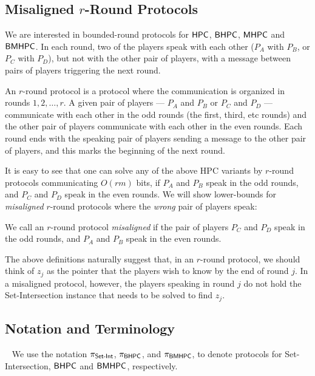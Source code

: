 \documentclass[11pt,letterpaper]{article}
\theoremstyle{definition}
\newcommand{\bhpc}{\ensuremath{\textnormal{\textsf{BHPC}}}\xspace}
\newcommand{\bmhpc}{\ensuremath{\textnormal{\textsf{BMHPC}}}\xspace}
\newcommand{\hpc}{\ensuremath{\textnormal{\textsf{HPC}}}\xspace}
\newcommand{\mhpc}{\ensuremath{\textnormal{\textsf{MHPC}}}\xspace}
\newcommand{\mypar}[1]{\smallskip\noindent{\sffamily\bfseries #1.}~}
\newcommand{\prot}{\ensuremath{\pi}}
\newcommand{\SI}{\ensuremath{\textnormal{\textsf{Set-Int}}}\xspace}
\begin{document}
\subsection{Misaligned \texorpdfstring{$r$-Round}{r-Round} Protocols}

We are interested in bounded-round protocols for $\hpc$, $\bhpc$, $\mhpc$ and $\bmhpc$. In each round, two of the players speak with each other ($P_A$ with $P_B$, or $P_C$ with $P_D$), but not with the other pair of players, with a message between pairs of players triggering the next round.

\begin{definition}[Round of $\hpc_{m,r}$]\label{def:round}
An $r$-round protocol is a protocol where the communication is organized in rounds $1, 2, \ldots, r$. A given pair of players --- $P_A$ and $P_B$ or $P_C$ and $P_D$ --- communicate with each other in the odd rounds (the first, third, etc rounds) and the other pair of players communicate with each other in the even rounds. Each round ends with the speaking pair of players sending a message to the other pair of players, and this marks the beginning of the next round.
\end{definition}

It is easy to see that one can solve any of the above HPC variants by $r$-round protocols communicating $O(r m)$ bits, if $P_A$ and $P_B$ speak in the odd rounds, and $P_C$ and $P_D$ speak in the even rounds. We will show lower-bounds for \textit{misaligned} $r$-round protocols where the \textit{wrong} pair of players speak:

\begin{definition}
We call an $r$-round protocol \textit{misaligned} if the pair of players $P_C$ and $P_D$ speak in the odd rounds, and $P_A$ and $P_B$ speak in the even rounds.
\end{definition}

The above definitions naturally suggest that, in an $r$-round protocol, we should think of $z_j$ as the pointer that the players wish to know by the end of round $j$. In a misaligned protocol, however, the players speaking in round $j$ do not hold the Set-Intersection instance that needs to be solved to find $z_j$.

\subsection{Notation and Terminology}

\mypar{Notation for Protocols} We use the notation $\prot_\SI$, $\prot_\bhpc$,
and $\prot_\bmhpc$, to denote protocols for Set-Intersection, $\bhpc$ and
$\bmhpc$, respectively. 
\end{document}
